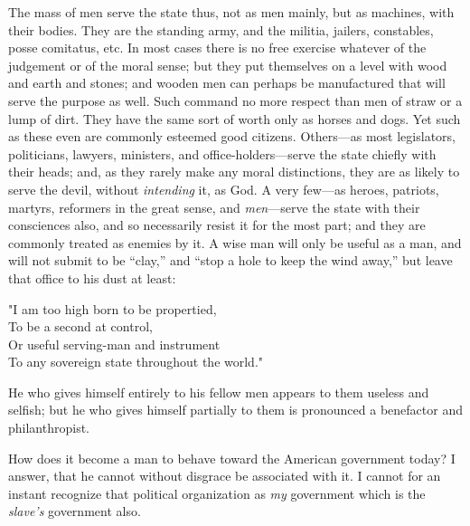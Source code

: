 \documentclass[12pt]{article}
\begin{document}
The mass of men serve the state thus, not as men mainly, but as
machines, with their bodies. They are the standing army, and the
militia, jailers, constables, posse comitatus, etc. In most cases there
is no free exercise whatever of the judgement or of the moral sense; but
they put themselves on a level with wood and earth and stones; and
wooden men can perhaps be manufactured that will serve the purpose as
well. Such command no more respect than men of straw or a lump of dirt.
They have the same sort of worth only as horses and dogs. Yet such as
these even are commonly esteemed good citizens. Others---as most
legislators, politicians, lawyers, ministers, and office-holders---serve
the state chiefly with their heads; and, as they rarely make any moral
distinctions, they are as likely to serve the devil, without
\emph{intending} it, as God. A very few---as heroes, patriots, martyrs,
reformers in the great sense, and \emph{men}---serve the state with
their consciences also, and so necessarily resist it for the most part;
and they are commonly treated as enemies by it. A wise man will only be
useful as a man, and will not submit to be ``clay,'' and ``stop a hole
to keep the wind away,'' but leave that office to his dust at least:
\begin{displayquote}
"I am too high born to be propertied,\\
To be a second at control,\\
Or useful serving-man and instrument\\
To any sovereign state throughout the world."
\end{displayquote}
\clearpage
He who gives himself entirely to his fellow men appears to them useless
and selfish; but he who gives himself partially to them is pronounced a
benefactor and philanthropist.

How does it become a man to behave toward the American government today?
I answer, that he cannot without disgrace be associated with it. I
cannot for an instant recognize that political organization as \emph{my}
government which is the \emph{slave's} government also.
\end{document}
